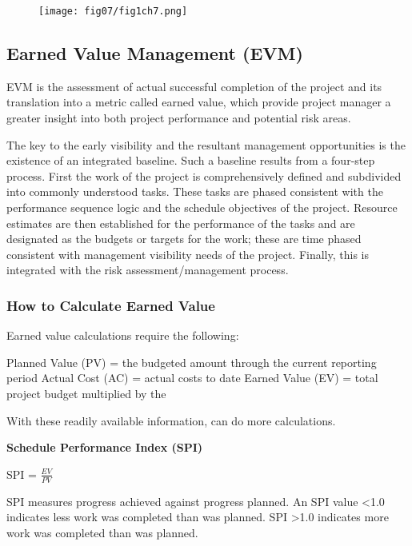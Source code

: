 \begin{figure}
	\centering
	\texttt{[image: fig07/fig1ch7.png]}
	\label{img14ch7}
\end{figure}



\subsection{Earned Value Management (EVM)}

EVM is the assessment of actual successful completion of the project and its translation into a metric called earned value, which provide project manager a greater insight into both project performance and potential risk areas.

The key to the early visibility and the resultant management opportunities is the existence of an integrated baseline. Such a baseline results from a four-step process. First the work of the project is comprehensively defined and subdivided into commonly understood tasks. These tasks are phased consistent with the performance sequence logic and the schedule objectives of the project. Resource estimates are then established for the performance of the tasks and are designated as the budgets or targets for the work; these are time phased consistent with management visibility needs of the project. Finally, this is integrated with the risk assessment/management process.


\subsubsection{How to Calculate Earned Value \cite{Sparrow}}

Earned value calculations require the following:

Planned Value (PV) = the budgeted amount through the current reporting period
Actual Cost (AC) = actual costs to date
Earned Value (EV) = total project budget multiplied by the %

With these readily available information, can do more calculations.

\textbf{Schedule Performance Index (SPI)}

 SPI = $\frac{EV}{PV}$

SPI measures progress achieved against progress planned. An SPI value <1.0 indicates less work was completed than was planned. SPI >1.0 indicates more work was completed than was planned.


